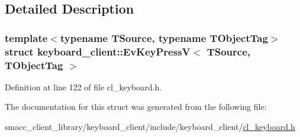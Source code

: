 \subsection{Detailed Description}
\subsubsection*{template$<$typename T\+Source, typename T\+Object\+Tag$>$\newline
struct keyboard\+\_\+client\+::\+Ev\+Key\+Press\+V$<$ T\+Source, T\+Object\+Tag $>$}



Definition at line 122 of file cl\+\_\+keyboard.\+h.



The documentation for this struct was generated from the following file\+:\begin{DoxyCompactItemize}
\item 
smacc\+\_\+client\+\_\+library/keyboard\+\_\+client/include/keyboard\+\_\+client/\hyperlink{cl__keyboard_8h}{cl\+\_\+keyboard.\+h}\end{DoxyCompactItemize}
